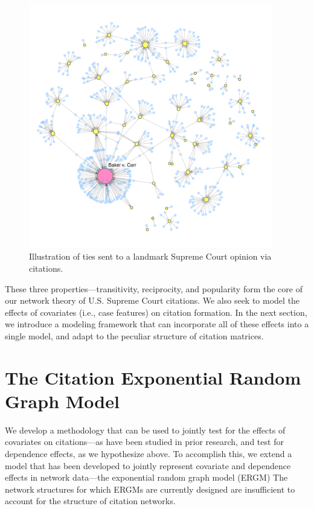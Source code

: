 \documentclass[headsepline=true, abstracton]{scrartcl}
\begin{document}
\begin{figure}[htp]
\centering
\includegraphics[width = 0.95\textwidth,trim= 0cm 3cm 6cm 8cm,clip=true ]{images/citations_pop.pdf}
\caption{Illustration of ties sent to a landmark Supreme Court opinion via citations.}
\label{fig:popularity}
\end{figure}

These three properties---transitivity, reciprocity, and popularity form the core of our network theory of U.S. Supreme Court citations. We also seek to model the effects of covariates (i.e., case features) on citation formation.  In the next section, we introduce a modeling framework that can incorporate all of these effects into a single model, and adapt to the peculiar structure of citation matrices.

 
\section{The Citation Exponential Random Graph Model}
We develop a methodology that can be used to jointly test for the effects of covariates on citations---as have been studied in prior research, and test for dependence effects, as we hypothesize above. To accomplish this, we extend a model that has been developed to jointly represent covariate and dependence effects in network data---the exponential random graph model (ERGM) \citep[e.g.,][]{welles2015individual,duque2018recognizing, graif2017neighborhood,osei2018elite}  %
The network structures for which ERGMs are currently designed are insufficient to account for the structure of citation networks.
\end{document}
